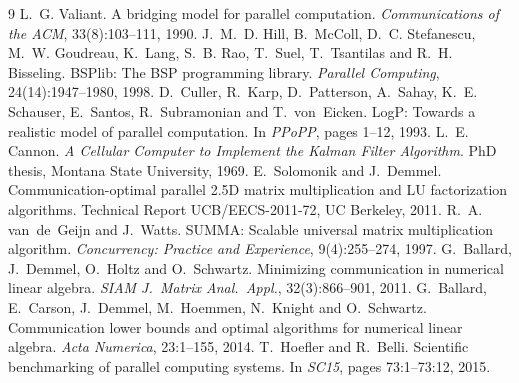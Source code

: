 \documentclass[11pt,a4paper]{article}
\begin{document}
\begin{thebibliography}{9}
\setlength{\itemsep}{1pt}
\small
{} L.~G. Valiant. A bridging model for parallel computation. \emph{Communications of the ACM}, 33(8):103--111, 1990.
 J.~M.~D. Hill, B.~McColl, D.~C. Stefanescu, M.~W. Goudreau, K.~Lang, S.~B. Rao, T.~Suel, T.~Tsantilas and R.~H. Bisseling. BSPlib: The BSP programming library. \emph{Parallel Computing}, 24(14):1947--1980, 1998.
 D.~Culler, R.~Karp, D.~Patterson, A.~Sahay, K.~E. Schauser, E.~Santos, R.~Subramonian and T.~von~Eicken. LogP: Towards a realistic model of parallel computation. In \emph{PPoPP}, pages 1--12, 1993.
 L.~E. Cannon. \emph{A Cellular Computer to Implement the Kalman Filter Algorithm}. PhD thesis, Montana State University, 1969.
 E.~Solomonik and J.~Demmel. Communication-optimal parallel 2.5D matrix multiplication and LU factorization algorithms. Technical Report UCB/EECS-2011-72, UC Berkeley, 2011.
 R.~A. van~de~Geijn and J.~Watts. SUMMA: Scalable universal matrix multiplication algorithm. \emph{Concurrency: Practice and Experience}, 9(4):255--274, 1997.
 G.~Ballard, J.~Demmel, O.~Holtz and O.~Schwartz. Minimizing communication in numerical linear algebra. \emph{SIAM J.\ Matrix Anal.\ Appl.}, 32(3):866--901, 2011.
 G.~Ballard, E.~Carson, J.~Demmel, M.~Hoemmen, N.~Knight and O.~Schwartz. Communication lower bounds and optimal algorithms for numerical linear algebra. \emph{Acta Numerica}, 23:1--155, 2014.
 T.~Hoefler and R.~Belli. Scientific benchmarking of parallel computing systems. In \emph{SC15}, pages 73:1--73:12, 2015.
\end{thebibliography}
\end{document}

